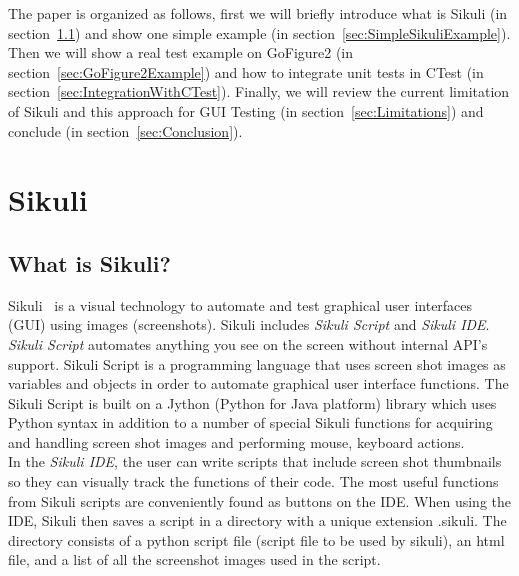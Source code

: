 \documentclass{InsightArticle}
\begin{document}
The paper is organized as follows, first we will briefly introduce what is
Sikuli (in section~\ref{sec:WhatIsSikuli}) and show one simple example (in
section~\ref{sec:SimpleSikuliExample}). Then we will show a real test example
on GoFigure2 (in section~\ref{sec:GoFigure2Example}) and how to integrate
unit tests in CTest (in section~\ref{sec:IntegrationWithCTest}). Finally, we
will review the current limitation of Sikuli and this approach for GUI Testing
(in section~\ref{sec:Limitations}) and conclude (in
section~\ref{sec:Conclusion}).


\section{Sikuli}

\subsection{What is Sikuli?}
\label{sec:WhatIsSikuli}

Sikuli~\cite{Sikuli:Documentation,Sikuli:Website,Yeh:2009:Sikuli} is a visual
technology to automate and test graphical user interfaces (GUI) using images
(screenshots). Sikuli includes \emph{Sikuli Script} and \emph{Sikuli IDE}.\\

\emph{Sikuli Script} automates anything you see on the screen without internal
API's support. Sikuli Script is a programming language that uses screen shot
images as variables and objects in order to automate graphical user interface
functions. The Sikuli Script is built on a Jython (Python for Java platform)
library which uses Python syntax in addition to a number of special Sikuli
functions for acquiring and handling screen shot images and performing mouse,
keyboard actions.\\

In the \emph{Sikuli IDE}, the user can write scripts that include screen shot
thumbnails so they can visually track the functions of their code. The most
useful functions from Sikuli scripts are conveniently found as
buttons on the IDE. When using the IDE, Sikuli then saves a script in a
directory with a unique extension .sikuli. The directory consists of a python
script file (script file to be used by sikuli), an html file, and a list of all
the screenshot images used in the script.
\end{document}
